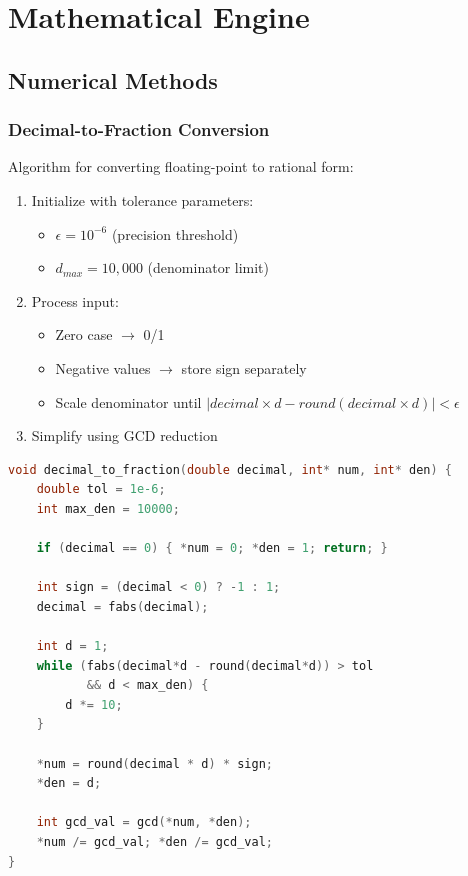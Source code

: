 \documentclass{article}
\begin{document}
\section{Mathematical Engine}



\subsection{Numerical Methods}

\subsubsection{Decimal-to-Fraction Conversion}
Algorithm for converting floating-point to rational form:

\begin{enumerate}
\item Initialize with tolerance parameters:
  \begin{itemize}
  \item $\epsilon = 10^{-6}$ (precision threshold)
  \item $d_{max} = 10,000$ (denominator limit)
  \end{itemize}
\item Process input:
  \begin{itemize}
  \item Zero case $\rightarrow$ 0/1
  \item Negative values $\rightarrow$ store sign separately
  \item Scale denominator until $|decimal \times d - round(decimal \times d)| < \epsilon$
  \end{itemize}
\item Simplify using GCD reduction
\end{enumerate}

\begin{lstlisting}[language=C,caption=Decimal to Fraction]
void decimal_to_fraction(double decimal, int* num, int* den) {
    double tol = 1e-6;
    int max_den = 10000;
    
    if (decimal == 0) { *num = 0; *den = 1; return; }
    
    int sign = (decimal < 0) ? -1 : 1;
    decimal = fabs(decimal);
    
    int d = 1;
    while (fabs(decimal*d - round(decimal*d)) > tol 
           && d < max_den) {
        d *= 10;
    }
    
    *num = round(decimal * d) * sign;
    *den = d;
    
    int gcd_val = gcd(*num, *den);
    *num /= gcd_val; *den /= gcd_val;
}
\end{lstlisting}
\end{document}
